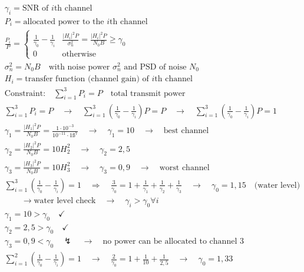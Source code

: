 \begin{align*}
	&\gamma_{i}=\text{SNR of $i$th channel}& \\
	&P_{i}=\text{allocated power to the $i$th channel}& \\
	&\frac{P_{i}}{P}=
	\begin{cases}
	\frac{1}{\gamma_{0}}-\frac{1}{\gamma_{i}} & \frac{\left|H_{i}\right|^{2}P}{\sigma_{n}^{2}}=\frac{\left|H_{i}\right|^{2}P}{N_{0}B}\ge\gamma_{0} \\
	0 & \text{otherwise}
	\end{cases}& \\
	&\sigma_{n}^{2}=N_{0}B\quad\text{with noise power $\sigma_{n}^{2}$ and PSD of noise $N_{0}$}& \\
	&H_{i}=\text{transfer function (channel gain) of $i$th channel}& \\
	&\text{Constraint:}\quad\sum_{i=1}^{3}P_{i}=P\quad\text{total transmit power}& \\
	&\sum_{i=1}^{3}P_{i}=P\quad\rightarrow\quad\sum_{i=1}^{3}\left(\frac{1}{\gamma_{0}}-\frac{1}{\gamma_{i}}\right)P=P\quad\rightarrow\quad\boxed{\sum_{i=1}^{3}\left(\frac{1}{\gamma_{0}}-\frac{1}{\gamma_{i}}\right)P=1}& \\
	&\gamma_{1}=\frac{\left|H_{1}\right|^{2}P}{N_{0}B}=\frac{1\cdot 10^{-3}}{10^{-11}\cdot 1ß^{7}}\quad\rightarrow\quad\gamma_{1}=10\quad\rightarrow\quad\text{best channel}& \\
	&\gamma_{2}=\frac{\left|H_{2}\right|^{2}P}{N_{0}B}=10H_{2}^{2}\quad\rightarrow\quad\gamma_{2}=2,5& \\
	&\gamma_{3}=\frac{\left|H_{3}\right|^{2}P}{N_{0}B}=10H_{3}^{2}\quad\rightarrow\quad\gamma_{3}=0,9\quad\rightarrow\quad\text{worst channel}& \\
	&\sum_{i=1}^{3}\left(\frac{1}{\gamma_{0}}-\frac{1}{\gamma_{i}}\right)=1\quad\Rightarrow\quad\frac{3}{\gamma_{0}}=1+\frac{1}{\gamma_{1}}+\frac{1}{\gamma_{2}}+\frac{1}{\gamma_{3}}\quad\rightarrow\quad\gamma_{0}=1,15\quad\text{(water level)}& \\
	&\qquad\rightarrow\text{water level check}\quad\rightarrow\quad\gamma_{i}>\gamma_{0}\forall i& \\
	&\gamma_{1}=10>\gamma_{0}\quad\checkmark& \\
	&\gamma_{2}=2,5>\gamma_{0}\quad\checkmark& \\
	&\gamma_{3}=0,9<\gamma_{0}\quad\lightning\quad\rightarrow\quad\text{no power can be allocated to channel 3}& \\
	&\sum_{i=1}^{2}\left(\frac{1}{\gamma_{0}}-\frac{1}{\gamma_{i}}\right)=1\quad\rightarrow\quad\frac{2}{\gamma_{0}}=1+\frac{1}{10}+\frac{1}{2,5}\quad\rightarrow\quad\gamma_{0}=1,33& \\

\end{align*}
